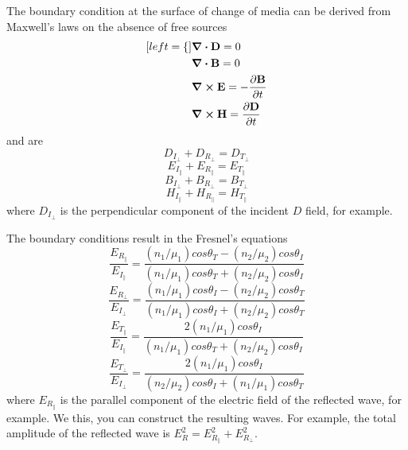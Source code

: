 \documentclass[oneside, 10pt, notitlepage]{book}
\begin{document}
The boundary condition at the surface of change of media can be derived from Maxwell's laws on the absence of free sources
\begin{subequations}
    \begin{align}[left = \empheqlbrace\,]
    & \div{\vb{D}} = 0 \\
	& \div{\vb{B}} = 0 \\
	& \curl{\vb{E}} = -\pdv{\vb{B}}{t} \\
	& \curl{\vb{H}} = \pdv{\vb{D}}{t}
    \end{align}
\end{subequations}
and are
\begin{equation} D_{I_{\perp}} + D_{R_{\perp}}= D_{T_{\perp}}\end{equation}
\begin{equation} E_{I_{\parallel}} + E_{R_{\parallel}} = E_{T_{\parallel}}\end{equation}
\begin{equation} B_{I_{\perp}} + B_{R_{\perp}} = B_{T_{\perp}}\end{equation}
\begin{equation} H_{I_{\parallel}} + H_{R_{\parallel}} = H_{T_{\parallel}}\end{equation}
where \(D_{I_{\perp}}\) is the perpendicular component of the incident \(D\) field, for example.

The boundary conditions result in the Fresnel's equations
\begin{equation} 
    \frac{E_{R_{\parallel}}}{E_{I_{\parallel}}} = \frac{(n_1/\mu_1)cos\theta_T - (n_2/\mu_2)cos\theta_I}{(n_1/\mu_1)cos\theta_T + (n_2/\mu_2)cos\theta_I}
\end{equation}
\begin{equation} 
    \frac{E_{R_{\perp}}}{E_{I_{\perp}}} = \frac{(n_1/\mu_1)cos\theta_I - (n_2/\mu_2)cos\theta_T}{(n_1/\mu_1)cos\theta_I + (n_2/\mu_2)cos\theta_T}
\end{equation}
\begin{equation} 
    \frac{E_{T_{\parallel}}}{E_{I_{\parallel}}}  = \frac{2(n_1/\mu_1)cos\theta_I}{(n_1/\mu_1)cos\theta_T + (n_2/\mu_2)cos\theta_I}
\end{equation}
\begin{equation} 
    \frac{E_{T_{\perp}}}{E_{I_{\perp}}} = \frac{2(n_1/\mu_1)cos\theta_I}{(n_2/\mu_2)cos\theta_I + (n_1/\mu_1)cos\theta_T}
\end{equation}
where \(E_{R_{\parallel}}\) is the parallel component of the electric field of the reflected wave, for example. We this, you can construct the resulting waves. For example, the total amplitude of the reflected wave is \(E_R^2 = E_{R_{\parallel}}^2 + E_{R_{\perp}}^2\).
\end{document}
